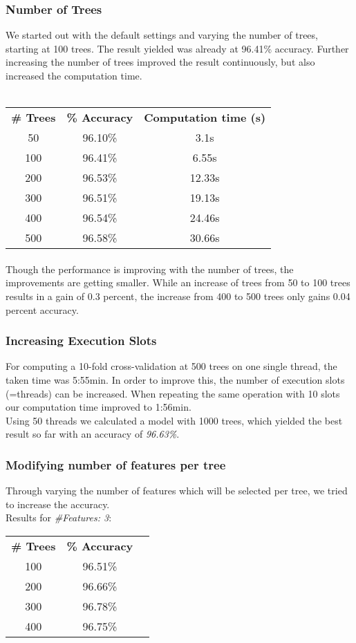 \documentclass{sig-alternate-05-2015}
\begin{document}
{\subsubsection{Number of Trees} We started out with the default settings and varying the number of trees, starting at 100 trees. The result yielded was already at 96.41\% accuracy. Further increasing the number of trees improved the result continuously, but also increased the computation time. 
\\\\
\begin{tabular}{ c | c | c }
\textbf{\# Trees} & \textbf{\% Accuracy} & \textbf{Computation time (s)} \\
50 & 96.10\% & 3.1s \\
100 & 96.41\% & 6.55s \\
200 & 96.53\% & 12.33s \\
300 & 96.51\% & 19.13s \\
400 & 96.54\% & 24.46s \\
500 & 96.58\% & 30.66s\\
\end{tabular}

\paragraph{}Though the performance is improving with the number of trees, the improvements are getting smaller. While an increase of trees from 50 to 100 trees results in a gain of 0.3 percent, the increase from 400 to 500 trees only gains 0.04 percent accuracy. 
\subsubsection{Increasing Execution Slots}For computing a 10-fold cross-validation at 500 trees on one single thread, the taken time was 5:55min. In order to improve this, the number of execution slots (=threads) can be increased. When repeating the same operation with 10 slots our computation time improved to 1:56min. \\
Using 50 threads we calculated a model with 1000 trees, which yielded the best result so far with an accuracy of \emph{96.63\%}. 
\subsubsection{Modifying number of features per tree}
Through varying the number of features which will be selected per tree, we tried to increase the accuracy. \\
Results for \emph{\#Features: 3}:\\
\begin{tabular}{ c | c | c }
\textbf{\# Trees} & \textbf{\% Accuracy} \\
100 & 96.51\% \\
200 & 96.66\% \\
300 & 96.78\% \\
400 & 96.75\% \\
\end{tabular}

}
\end{document}
